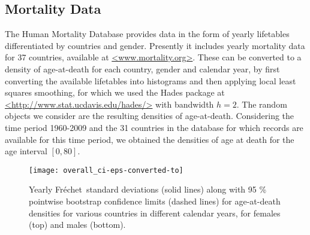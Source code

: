\documentclass[lineno]{biometrika}
\newcommand{\no}{\noindent}
\def\F{Fr\'{e}chet}
\begin{document}
\subsection{Mortality Data}
	\no The Human Mortality Database provides data in the form of yearly lifetables differentiated by countries and gender. Presently it includes  yearly mortality data for 37 countries, available at  \url{<www.mortality.org>}. These can be converted to a density of age-at-death for each country, gender and calendar year, by first converting the available lifetables into histograms and then applying local least squares smoothing,  for which we used the Hades package at 
\url{<http://www.stat.ucdavis.edu/hades/>}  with bandwidth $h=2$.   %
The random objects we consider are the resulting densities of age-at-death. Considering  the time period 1960-2009 and the  31 countries in the database for which records are available  for this time period, we obtained the densities of age at death for the age interval $[0,80]$.  %

\begin{figure}[H]
	\centering
	\texttt{[image: overall\_ci-eps-converted-to]}
	\caption{Yearly \F \ standard deviations (solid lines) along with 95 \% pointwise bootstrap confidence limits (dashed lines) for age-at-death densities for various countries in different calendar years, for  females (top) and males (bottom).}
	\label{fig:fig_8}
\end{figure}
\end{document}
